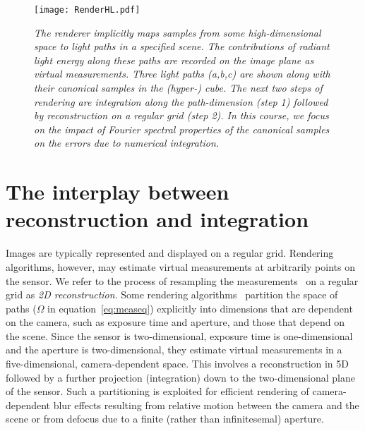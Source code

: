 \documentclass[11pt,fleqn]{book} %
\newcommand{\TBC} {}
\begin{document}
\TBC 
\begin{figure}
 \centering
 {
  \texttt{[image: RenderHL.pdf]}
 }
 \caption{\emph{The renderer implicitly maps samples from some high-dimensional space to light paths in a specified scene. The contributions of radiant light energy along these paths are recorded on the image plane as virtual measurements. Three light paths (a,b,c) are shown along with their canonical samples in the (hyper-) cube. The next two steps of rendering are integration along the path-dimension (step 1) followed by reconstruction on a regular grid (step 2). In this course, we focus on the impact of Fourier spectral properties of the canonical samples on the errors due to numerical integration.}}
 \label{fig:renderhl}
\end{figure}


\section{The interplay between reconstruction and integration}
Images are typically represented and displayed on a regular grid. Rendering algorithms, however, may estimate virtual measurements at arbitrarily points on the sensor. We refer to the process of resampling the measurements \Ij{}\ on a regular grid as \textit{2D reconstruction}. Some rendering algorithms~\cite{Hachisuka:2008,Egan:2009,Soler:2009,Cov5D} partition the space of paths ($\Omega$ in equation~\ref{eq:measeq}) explicitly into dimensions that are dependent on the camera, such as exposure time and aperture, and those that depend on the scene. Since the sensor is two-dimensional, exposure time is one-dimensional and the aperture is two-dimensional, they estimate virtual measurements in a five-dimensional, camera-dependent space. This involves a reconstruction in 5D followed by a further projection (integration) down to the two-dimensional plane of the sensor. Such a partitioning is exploited for efficient rendering of camera-dependent blur effects resulting from relative motion between the camera and the scene or from defocus due to a finite (rather than infinitesemal) aperture.

\TBC
\end{document}
